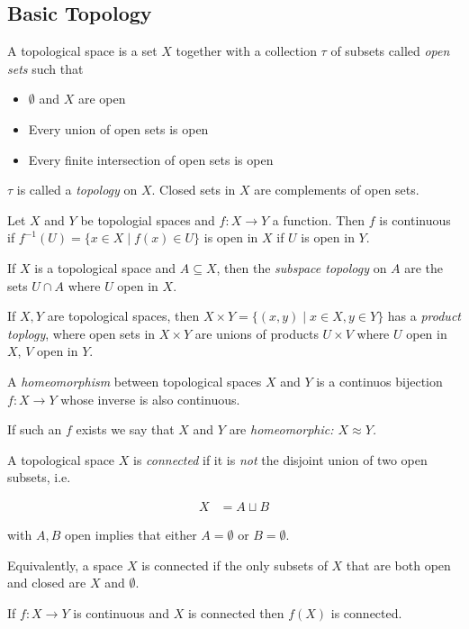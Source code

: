 \subsection{Basic Topology}
\begin{defn}
A topological space is a set $X$ together with a collection $\tau$
of subsets called \emph{open sets }such that\end{defn}
\begin{itemize}
\item $\emptyset$ and $X$ are open
\item Every union of open sets is open
\item Every finite intersection of open sets is open
\end{itemize}
$\tau$ is called a \emph{topology} on $X$. Closed sets in $X$ are
complements of open sets.
\begin{defn}
Let $X$ and $Y$ be topologial spaces and $f:X\to Y$ a function.
Then $f$ is continuous if $f^{-1}(U)=\{x\in X\mid f(x)\in U\}$ is
open in $X$ if $U$ is open in $Y$.
\end{defn}

\begin{defn}
If $X$ is a topological space and $A\subseteq X$, then the \emph{subspace
topology} on $A$ are the sets $U\cap A$ where $U$ open in $X$.
\end{defn}

\begin{defn}
If $X,Y$ are topological spaces, then $X\times Y=\{(x,y)\mid x\in X,y\in Y\}$
has a \emph{product toplogy}, where open sets in $X\times Y$ are
unions of products $U\times V$ where $U$ open in $X$, $V$ open
in $Y$.
\end{defn}

\begin{defn}
A \emph{homeomorphism} between topological spaces $X$ and $Y$ is
a continuos bijection $f:X\to Y$ whose inverse is also continuous.

If such an $f$ exists we say that $X$ and $Y$ are \emph{homeomorphic:
$X\approx Y$.}
\end{defn}

\begin{defn}
A topological space $X$ is \emph{connected} if it is \emph{not} the
disjoint union of two open subsets, i.e.

\begin{align*}
X & =A\sqcup B
\end{align*}


with $A,B$ open implies that either $A=\emptyset$ or $B=\emptyset$.

Equivalently, a space $X$ is connected if the only subsets of $X$
that are both open and closed are $X$ and $\emptyset$.\end{defn}
\begin{thm}
If $f:X\to Y$ is continuous and $X$ is connected then $f(X)$ is
connected.
\end{thm}


